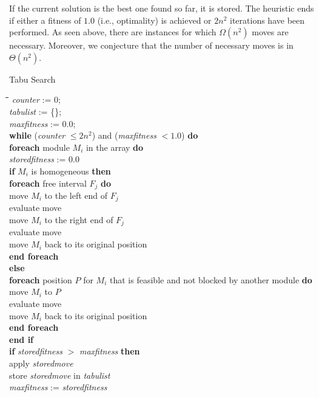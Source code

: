 \documentclass{article}
\begin{document}
If the current solution is the best one found so far, it is stored.
The heuristic ends if either a fitness of $1.0$ (i.e., optimality)
is achieved or $2n^2$ iterations have been performed. As seen above,
there are instances for which $\Omega(n^2)$ moves are necessary. 
Moreover, we conjecture that the number of necessary moves is 
in $\Theta(n^2)$. 
\begin{algorithm}[p]\caption{Tabu Search}
\begin{tabbing}
\mbox\qquad\=\qquad\=\qquad\=\qquad\=\kill
{\it counter} := 0;\\
{\it tabulist} := \{\};\\
{\it maxfitness} := 0.0;\\

{\bf while} ({\it counter} $\leq 2n^2$) and ({\it maxfitness} $< 1.0$) {\bf do}\\
\> {\bf foreach} module $M_i$ in the array {\bf do}\\
\>\> {\it storedfitness} := 0.0\\
\>\> {\bf if} $M_i$ is homogeneous {\bf then}\\
\>\>\> {\bf foreach} free interval $F_j$ {\bf do}\\
\>\>\>\> move $M_i$ to the left end of $F_j$\\
\>\>\>\> evaluate move\\
\>\>\>\> move $M_i$ to the right end of $F_j$\\
\>\>\>\> evaluate move\\
\>\>\>\> move $M_i$ back to its original position\\
\>\>\> {\bf end foreach}\\
\>\> {\bf else}\\
\>\>\> {\bf foreach} position $P$ for $M_i$ that is feasible and not blocked by another module {\bf do}\\
\>\>\>\> move $M_i$ to $P$\\
\>\>\>\> evaluate move\\
\>\>\>\> move $M_i$ back to its original position\\
\>\>\> {\bf end foreach}\\
\>\> {\bf end if}\\
\>\> {\bf if} {\it storedfitness} $>$ {\it maxfitness} {\bf then}\\
\>\>\> apply {\it storedmove}\\
\>\>\> store {\it storedmove} in {\it tabulist}\\
\>\>\> {\it maxfitness} := {\it storedfitness}\\

\end{tabbing}
\end{algorithm}
\end{document}
